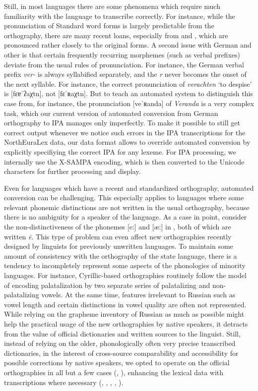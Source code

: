 Still, in most languages there are some phenomena which require much familiarity with the language to transcribe correctly. For instance, while the pronunciation of Standard  word forms is largely predictable from the orthography, there are many recent loans, especially from  and , which are pronounced rather closely to the original forms. A second issue with German and other  is that certain frequently recurring morphemes (such as verbal prefixes) deviate from the usual rules of pronunciation. For instance, the German verbal prefix \textit{ver-} is always syllabified separately, and the \textit{r} never becomes the onset of the next syllable. For instance, the correct pronunciation of \textit{verachten} `to despise' is [fɛɐˈʔaχtn], not [fɛˈʀaχtn]. But to teach an automated system to distinguish this case from, for instance, the pronunciation [veˈʀanda] of \textit{Veranda} is a very complex task, which our current version of automated conversion from German orthography to IPA manages only imperfectly. To make it possible to still get correct output whenever we notice such errors in the IPA transcriptions for the NorthEuraLex data, our data format allows to override automated conversion by explicitly specifiying the correct IPA for any lexeme. For IPA processing, we internally use the X-SAMPA encoding, which is then converted to the Unicode characters for further processing and display.

Even for languages which have a recent and standardized orthography, automated conversion can be challenging. This especially applies to languages where some relevant phonemic distinctions are not written in the usual orthography, because there is no ambiguity for a speaker of the language. As a case in point, consider the non-distinctiveness of the phonemes [eː] and [æː] in , both of which are written \textit{\={e}}. This type of problem can even affect new orthographies recently designed by linguists for previously unwritten languages. To maintain some amount of consistency with the orthography of the state language, there is a tendency to incompletely represent some aspects of the phonologies of minority languages. For instance, Cyrillic-based orthographies routinely follow the  model of encoding palatalization by two separate series of palatalizing and non-palatalizing vowels. At the same time, features irrelevant to Russian such as vowel length and certain distinctions in vowel quality are often not represented. While relying on the grapheme inventory of Russian as much as possible might help the practical usage of the new orthographies by native speakers, it detracts from the value of official dictionaries and written sources to the linguist. Still, instead of relying on the older, phonologically often very precise transcribed dictionaries, in the interest of cross-source comparability and accessibility for possible corrections by native speakers, we opted to operate on the official orthographies in all but a few cases (, ), enhancing the lexical data with transcriptions where necessary (, , , , ).


